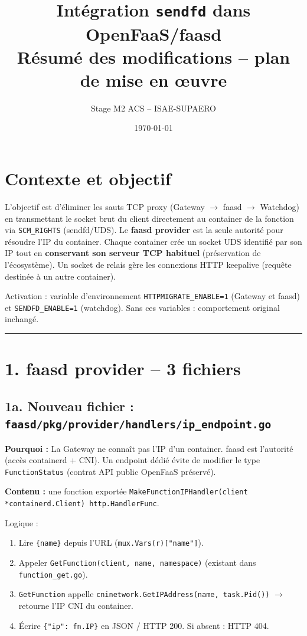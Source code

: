 \documentclass[11pt,a4paper]{article}
\title{
  \vspace{-1cm}
  \textbf{Intégration \texttt{sendfd} dans OpenFaaS/faasd}\\[0.3em]
  \large Résumé des modifications -- plan de mise en œuvre
}
\author{Stage M2 ACS -- ISAE-SUPAERO}
\date{\today}
\begin{document}
\maketitle
\thispagestyle{fancy}

\section*{Contexte et objectif}

L'objectif est d'éliminer les sauts TCP proxy (Gateway $\to$ faasd $\to$ Watchdog) en
transmettant le socket brut du client directement au container de la fonction via
\texttt{SCM\_RIGHTS} (sendfd/UDS). Le \textbf{faasd provider} est la seule autorité pour
résoudre l'IP du container. Chaque container crée un socket UDS identifié par son IP
tout en \textbf{conservant son serveur TCP habituel} (préservation de l'écosystème).
Un socket de relais gère les connexions HTTP keepalive (requête destinée à un autre container).

Activation : variable d'environnement \texttt{HTTPMIGRATE\_ENABLE=1} (Gateway et faasd)
et \texttt{SENDFD\_ENABLE=1} (watchdog). Sans ces variables : comportement original inchangé.

\bigskip\hrule\bigskip

\section*{1. faasd provider -- 3 fichiers}

\subsection*{1a. Nouveau fichier : \texttt{faasd/pkg/provider/handlers/ip\_endpoint.go}}

\textbf{Pourquoi :} La Gateway ne connaît pas l'IP d'un container. faasd est l'autorité
(accès containerd + CNI). Un endpoint dédié évite de modifier le type \texttt{FunctionStatus}
(contrat API public OpenFaaS préservé).

\textbf{Contenu :} une fonction exportée \texttt{MakeFunctionIPHandler(client *containerd.Client) http.HandlerFunc}.

Logique :
\begin{enumerate}[noitemsep]
  \item Lire \texttt{\{name\}} depuis l'URL (\texttt{mux.Vars(r)["name"]}).
  \item Appeler \texttt{GetFunction(client, name, namespace)} (existant dans
    \texttt{function\_get.go}).
  \item \texttt{GetFunction} appelle \texttt{cninetwork.GetIPAddress(name, task.Pid())}
    $\to$ retourne l'IP CNI du container.
  \item Écrire \texttt{\{"ip": fn.IP\}} en JSON / HTTP 200. Si absent : HTTP 404.
\end{enumerate}
\end{document}
